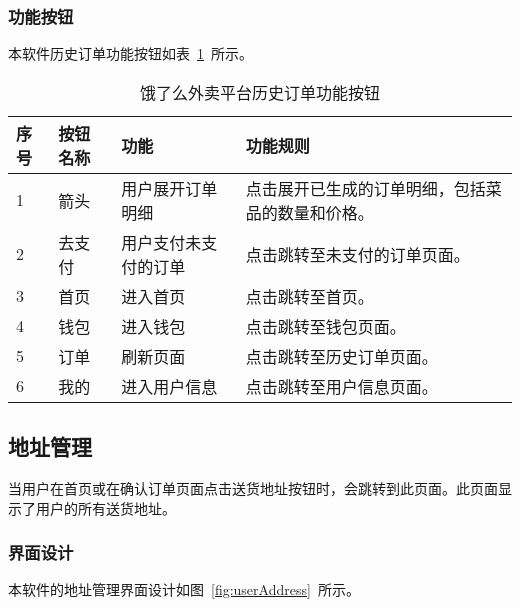 \subsubsection{功能按钮}
本软件历史订单功能按钮如表~\ref{tab:table12}~所示。
\begin{table}[htbp]
    \caption{饿了么外卖平台历史订单功能按钮}\label{tab:table12}
    \vspace{0.5em}\wuhao
    \begin{tabularx}{\textwidth}{lllX}
    \toprule[1.5pt]
    序号 & 按钮名称 & 功能 & 功能规则 \\ 
    \midrule[1pt]
    1 & 箭头 & 用户展开订单明细 & 点击展开已生成的订单明细，包括菜品的数量和价格。 \\
    2 & 去支付 & 用户支付未支付的订单 & 点击跳转至未支付的订单页面。 \\
    3 & 首页 & 进入首页 & 点击跳转至首页。 \\
    4 & 钱包 & 进入钱包 & 点击跳转至钱包页面。 \\
    5 & 订单 & 刷新页面 & 点击跳转至历史订单页面。 \\
    6 & 我的 & 进入用户信息 & 点击跳转至用户信息页面。 \\
\bottomrule[1.5pt]
\end{tabularx}
\vspace{\baselineskip}
\end{table}

\subsection{地址管理}
当用户在首页或在确认订单页面点击送货地址按钮时，会跳转到此页面。此页面显示了用户的所有送货地址。
\subsubsection{界面设计}
本软件的地址管理界面设计如图~\ref{fig:userAddress}~所示。
